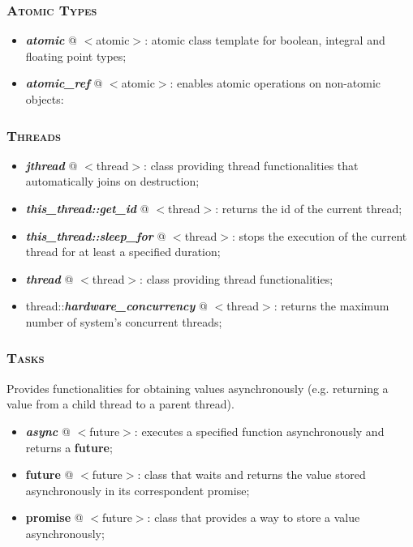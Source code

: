 \documentclass[10pt]{article}
\begin{document}
\begin{multicols*}{5}
{\subsubsection*{\textsc{Atomic Types}} 
\begin{itemize}[leftmargin=*,topsep=0.25pt]
  \setlength\itemsep{-1.8pt}
	\item  \emph{\textbf{atomic}} @ $<$atomic$>$: atomic class template for boolean, integral and floating point types;
	\item  \emph{\textbf{atomic\_ref}} @ $<$atomic$>$: enables atomic operations on non-atomic objects: 
\end{itemize}


\subsubsection*{\textsc{Threads}}
\begin{itemize}[leftmargin=*,topsep=0.25pt]
  \setlength\itemsep{-1.8pt}
	\item  \emph{\textbf{jthread}} @ $<$thread$>$: class providing thread functionalities that automatically joins on destruction;
	\item  \emph{\textbf{this\_thread::get\_id}} @ $<$thread$>$: returns the id of the current thread;
	\item  \emph{\textbf{this\_thread::sleep\_for}} @ $<$thread$>$: stops the execution of the current thread for at least a specified duration;
	\item  \emph{\textbf{thread}} @ $<$thread$>$: class providing thread functionalities;
	\item  thread::\emph{\textbf{hardware\_concurrency}} @ $<$thread$>$: returns the maximum number of system's concurrent threads;
\end{itemize}


\subsubsection*{\textsc{Tasks}}
\noindent
Provides functionalities for obtaining values asynchronously (e.g. returning a value from a child thread to a parent thread).
\begin{itemize}[leftmargin=*,topsep=0.25pt]
  \setlength\itemsep{-1.8pt}
	\item  \emph{\textbf{async}} @ $<$future$>$: executes a specified function asynchronously and returns a \textbf{future};
	\item  {\textbf{future}} @ $<$future$>$: class that waits and returns the value stored asynchronously in its correspondent promise;
	\item  {\textbf{promise}} @ $<$future$>$: class that provides a way to store a value asynchronously;
\end{itemize}


}
\end{multicols*}
\end{document}
